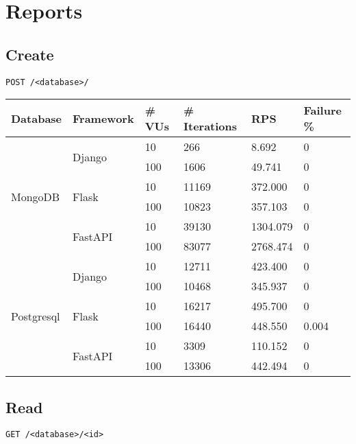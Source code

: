 \documentclass[12pt,onecolumn,a4paper,titlepage]{article}
\begin{document}
\pagebreak

\section{Reports}

\subsection{Create}

\begin{lstlisting}[style=mystyle]
    POST /<database>/
\end{lstlisting}

{\renewcommand{\arraystretch}{1.5}
\begin{tabular}{| p{1.8cm} | p{2cm} | p{1.3cm} | p{2cm} | p{1.9cm} | p{2cm} |} 
    \hline
    Database & Framework & \# VUs & \# \footnotesize{Iterations} & RPS & \footnotesize{Failure \%} \\
    \hline
    \multirow{6}{*}{MongoDB} & \multirow{2}{*}{Django} & 10 & 266 & 8.692 & 0\\
    & & 100 & 1606 & 49.741 & 0\\
    & \multirow{2}{*}{Flask} & 10 & 11169 & 372.000 & 0\\
    & & 100 & 10823 & 357.103 & 0\\
    & \multirow{2}{*}{FastAPI} & 10 & 39130 & 1304.079 & 0\\
    & & 100 & 83077 & 2768.474 & 0\\
    \hline
    \multirow{6}{*}{Postgresql} & \multirow{2}{*}{Django} & 10 & 12711 & 423.400 & 0\\
    & & 100 & 10468 & 345.937 & 0\\
    & \multirow{2}{*}{Flask} & 10 & 16217 & 495.700 & 0\\
    & & 100 & 16440 & 448.550 & 0.004\\
    & \multirow{2}{*}{FastAPI} & 10 & 3309 & 110.152 & 0\\
    & & 100 & 13306 & 442.494 & 0\\
    \hline
\end{tabular}
}

\pagebreak
\subsection{Read}

\begin{lstlisting}[style=mystyle]
    GET /<database>/<id>
\end{lstlisting}
\end{document}
